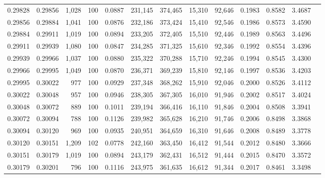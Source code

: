 \begin{tabular}{rrrrrrrrrrrrr}
0.29828 & 0.29856 & 1,028 & 100 &                                     0.0887 & 231,145 & 374,465 &  15,310 &  92,646 & 0.1983 & 0.8582 & 3.4687 \\
0.29856 & 0.29884 & 1,041 & 100 &                                     0.0876 & 232,186 & 373,424 &  15,410 &  92,546 & 0.1986 & 0.8573 & 3.4590 \\
0.29884 & 0.29911 & 1,019 & 100 &                                     0.0894 & 233,205 & 372,405 &  15,510 &  92,446 & 0.1989 & 0.8563 & 3.4496 \\
0.29911 & 0.29939 & 1,080 & 100 &                                     0.0847 & 234,285 & 371,325 &  15,610 &  92,346 & 0.1992 & 0.8554 & 3.4396 \\
0.29939 & 0.29966 & 1,037 & 100 &                                     0.0880 & 235,322 & 370,288 &  15,710 &  92,246 & 0.1994 & 0.8545 & 3.4300 \\
0.29966 & 0.29995 & 1,049 & 100 &                                     0.0870 & 236,371 & 369,239 &  15,810 &  92,146 & 0.1997 & 0.8536 & 3.4203 \\
0.29995 & 0.30022 &   977 & 100 &                                     0.0929 & 237,348 & 368,262 &  15,910 &  92,046 & 0.2000 & 0.8526 & 3.4112 \\
0.30022 & 0.30048 &   957 & 100 &                                     0.0946 & 238,305 & 367,305 &  16,010 &  91,946 & 0.2002 & 0.8517 & 3.4024 \\
0.30048 & 0.30072 &   889 & 100 &                                     0.1011 & 239,194 & 366,416 &  16,110 &  91,846 & 0.2004 & 0.8508 & 3.3941 \\
0.30072 & 0.30094 &   788 & 100 &                                     0.1126 & 239,982 & 365,628 &  16,210 &  91,746 & 0.2006 & 0.8498 & 3.3868 \\
0.30094 & 0.30120 &   969 & 100 &                                     0.0935 & 240,951 & 364,659 &  16,310 &  91,646 & 0.2008 & 0.8489 & 3.3778 \\
0.30120 & 0.30151 & 1,209 & 102 &                                     0.0778 & 242,160 & 363,450 &  16,412 &  91,544 & 0.2012 & 0.8480 & 3.3666 \\
0.30151 & 0.30179 & 1,019 & 100 &                                     0.0894 & 243,179 & 362,431 &  16,512 &  91,444 & 0.2015 & 0.8470 & 3.3572 \\
0.30179 & 0.30201 &   796 & 100 &                                     0.1116 & 243,975 & 361,635 &  16,612 &  91,344 & 0.2017 & 0.8461 & 3.3498 \\

\end{tabular}
